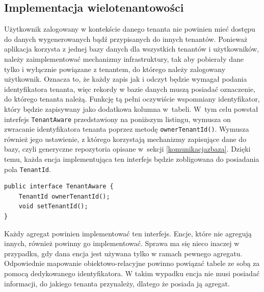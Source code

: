 \documentclass[a4paper]{book}
\begin{document}
{\subsection{Implementacja wielotenantowości}
Użytkownik zalogowany w kontekście danego tenanta nie powinien mieć dostępu do danych wygenerowanych bądź przypisanych do innych tenantów. Ponieważ aplikacja korzysta z jednej bazy danych dla wszystkich tenantów i użytkowników, należy zaimplementować mechanizmy infrastruktury, tak aby pobierały dane tylko i wyłącznie powiązane z tenantem, do którego należy zalogowany użytkownik. Oznacza to, że każdy zapis jak i odczyt będzie wymagał podania identyfikatora tenanta, więc rekordy w bazie danych muszą posiadać oznaczenie, do którego tenanta należą. Funkcję tą pełni oczywiście wspomniany identyfikator, który będzie zapisywany jako dodatkowa kolumna w~tabeli. W~tym celu powstał interfejs \lstinline|TenantAware| przedstawiony na poniższym listingu, wymusza on zwracanie identyfikatora tenanta poprzez metodę \lstinline|ownerTenantId()|. Wymusza również jego ustawienie, z którego korzystają mechanizmy zapisujące dane do bazy, czyli generyczne repozytoria opisane w~sekcji \ref{komunikacjazbaza}. Dzięki temu, każda encja implementująca ten interfejs będzie zobligowana do posiadania pola \lstinline|TenantId|. 
\begin{lstlisting}
public interface TenantAware {
	TenantId ownerTenantId();
	void setTenantId();
}
\end{lstlisting}
Każdy agregat powinien implementować ten interfejs. Encje, które nie agregują innych, również powinny go implementować. Sprawa ma się nieco inaczej w przypadku, gdy dana encja jest używana tylko w ramach pewnego agregatu. Odpowiednie mapowanie obiektowo-relacyjne powinno powiązać tabele ze sobą za pomocą dedykowanego identyfikatora. W takim wypadku encja nie musi posiadać informacji, do jakiego tenanta przynależy, dlatego że posiada ją agregat.

}
\end{document}
